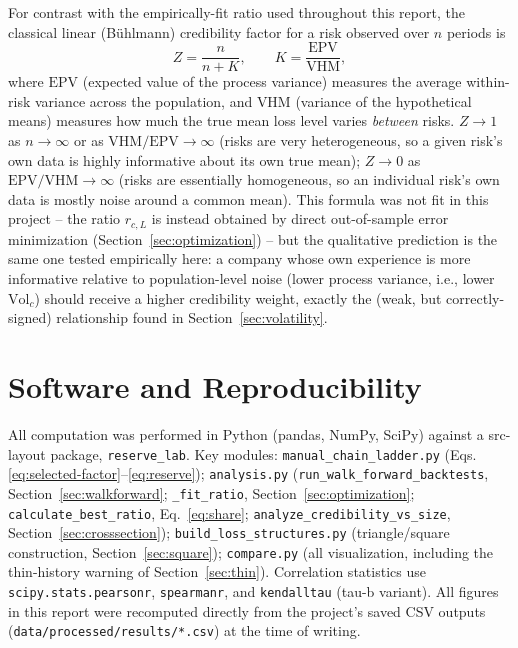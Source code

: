 \documentclass[11pt]{article}
\begin{document}
For contrast with the empirically-fit ratio used throughout this report, the classical linear
(Bühlmann) credibility factor for a risk observed over $n$ periods is
\begin{equation}
Z = \frac{n}{n+K}, \qquad K = \frac{\text{EPV}}{\text{VHM}},
\end{equation}
where $\text{EPV}$ (expected value of the process variance) measures the average within-risk
variance across the population, and $\text{VHM}$ (variance of the hypothetical means) measures how
much the true mean loss level varies \emph{between} risks. $Z\to1$ as $n\to\infty$ or as
$\text{VHM}/\text{EPV}\to\infty$ (risks are very heterogeneous, so a given risk's own data is
highly informative about its own true mean); $Z\to0$ as $\text{EPV}/\text{VHM}\to\infty$ (risks
are essentially homogeneous, so an individual risk's own data is mostly noise around a common
mean). This formula was not fit in this project -- the ratio $r_{c,L}$ is instead obtained by
direct out-of-sample error minimization (Section~\ref{sec:optimization}) -- but the qualitative
prediction is the same one tested empirically here: a company whose own experience is more
informative relative to population-level noise (lower process variance, i.e., lower $\text{Vol}_c$)
should receive a higher credibility weight, exactly the (weak, but correctly-signed) relationship
found in Section~\ref{sec:volatility}.

\section{Software and Reproducibility}

All computation was performed in Python (pandas, NumPy, SciPy) against a src-layout package,
\texttt{reserve\_lab}. Key modules: \texttt{manual\_chain\_ladder.py} (Eqs.
\ref{eq:selected-factor}--\ref{eq:reserve}); \texttt{analysis.py}
(\texttt{run\_walk\_forward\_backtests}, Section~\ref{sec:walkforward};
\texttt{\_fit\_ratio}, Section~\ref{sec:optimization}; \texttt{calculate\_best\_ratio},
Eq.~\ref{eq:share}; \texttt{analyze\_credibility\_vs\_size}, Section~\ref{sec:crosssection});
\texttt{build\_loss\_structures.py} (triangle/square construction, Section~\ref{sec:square});
\texttt{compare.py} (all visualization, including the thin-history warning of
Section~\ref{sec:thin}). Correlation statistics use \texttt{scipy.stats.pearsonr},
\texttt{spearmanr}, and \texttt{kendalltau} (tau-b variant). All figures in this report were
recomputed directly from the project's saved CSV outputs
(\texttt{data/processed/results/*.csv}) at the time of writing.
\end{document}
